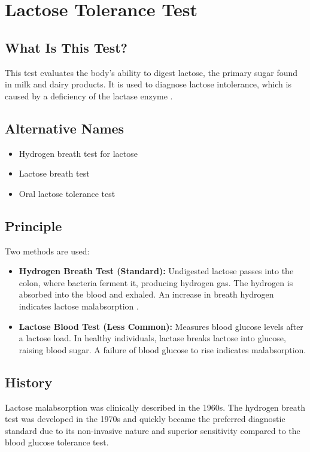 \chapter{Lactose Tolerance Test}

\section*{What Is This Test?}
This test evaluates the body's ability to digest lactose, the primary sugar found in milk and dairy products. It is used to diagnose lactose intolerance, which is caused by a deficiency of the lactase enzyme \cite{misselwitz2013lactose}.

\section*{Alternative Names}
\begin{itemize}
  \item Hydrogen breath test for lactose
  \item Lactose breath test
  \item Oral lactose tolerance test
\end{itemize}

\section*{Principle}
Two methods are used:
\begin{itemize}
    \item \textbf{Hydrogen Breath Test (Standard):} Undigested lactose passes into the colon, where bacteria ferment it, producing hydrogen gas. The hydrogen is absorbed into the blood and exhaled. An increase in breath hydrogen indicates lactose malabsorption \cite{gasbarrini2009methodology}.
    \item \textbf{Lactose Blood Test (Less Common):} Measures blood glucose levels after a lactose load. In healthy individuals, lactase breaks lactose into glucose, raising blood sugar. A failure of blood glucose to rise indicates malabsorption.
\end{itemize}

\section*{History}
Lactose malabsorption was clinically described in the 1960s. The hydrogen breath test was developed in the 1970s and quickly became the preferred diagnostic standard due to its non-invasive nature and superior sensitivity compared to the blood glucose tolerance test.


